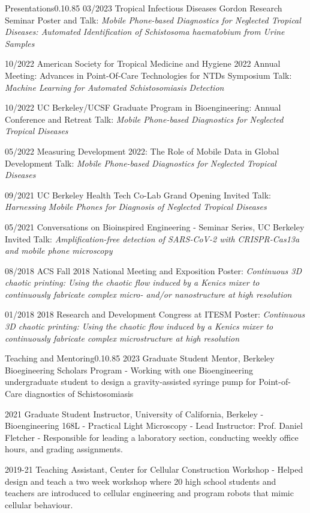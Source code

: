 \documentclass{federico_cv}
\begin{document}
\begin{tblSection}{Presentations}{0.1}{0.85}
\leftbfrightsingle
{03/2023}
{Tropical Infectious Diseases Gordon Research Seminar}
{Poster and Talk: \textit{Mobile Phone-based Diagnostics for Neglected Tropical Diseases: Automated Identification of Schistosoma haematobium from Urine Samples}}

\leftbfrightsingle
{10/2022}
{American Society for Tropical Medicine and Hygiene 2022 Annual Meeting: Advances in Point-Of-Care Technologies for NTDs Symposium}
{Talk: \textit{Machine Learning for Automated Schistosomiasis Detection}}

\leftbfrightsingle
{10/2022}
{UC Berkeley/UCSF Graduate Program in Bioengineering: Annual Conference and Retreat}
{Talk: \textit{Mobile Phone-based Diagnostics for Neglected Tropical Diseases}}

\leftbfrightsingle
{05/2022}
{Measuring Development 2022: The Role of Mobile Data in Global Development}
{Talk: \textit{Mobile Phone-based Diagnostics for Neglected Tropical Diseases}}

\leftbfrightsingle
{09/2021}
{UC Berkeley Health Tech Co-Lab Grand Opening}
{Invited Talk: \textit{Harnessing Mobile Phones for Diagnosis of Neglected Tropical Diseases}}

\leftbfrightsingle
{05/2021}
{Conversations on Bioinspired Engineering - Seminar Series, UC Berkeley}
{Invited Talk: \textit{Amplification-free detection of SARS-CoV-2 with CRISPR-Cas13a and mobile phone microscopy}}

\leftbfrightsinglenobreak
{08/2018}
{ACS Fall 2018 National Meeting and Exposition}
{Poster: \textit{Continuous 3D chaotic printing: Using the chaotic flow induced by a Kenics mixer to continuously fabricate complex micro- and/or nanostructure at high resolution}}

\leftbfrightsingle
{01/2018}
{2018 Research and Development Congress at ITESM}
{Poster: \textit{Continuous 3D chaotic printing: Using the chaotic flow induced by a Kenics mixer to continuously fabricate complex microstructure at high resolution}}

\end{tblSection}


\begin{tblSection}{Teaching and Mentoring}{0.1}{0.85}
\leftbfrightsingle
{2023}
{Graduate Student Mentor, Berkeley Bioegineering Scholars Program}
{- Working with one Bioengineering undergraduate student to design a gravity-assisted syringe pump for Point-of-Care diagnostics of Schistosomiasis}

\leftbfrightsingle
{2021}
{Graduate Student Instructor, University of California, Berkeley}
{- Bioengineering 168L - Practical Light Microscopy}
{- Lead Instructor: Prof. Daniel Fletcher}
{- Responsible for leading a laboratory section, conducting weekly office hours, and grading assignments.}

\leftbfrightsingle
{2019-21}
{Teaching Assistant, Center for Cellular Construction Workshop}
{- Helped design and teach a two week workshop where 20 high school students and teachers are introduced to cellular engineering and program robots that mimic cellular behaviour.}

\end{tblSection}
\end{document}
